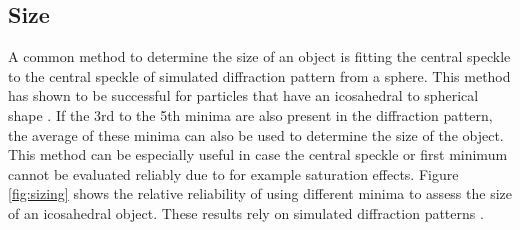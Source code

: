 \subsection{Size}
A common method to determine the size of an object is fitting the central speckle to the central speckle of simulated diffraction pattern from a sphere. This method has shown to be successful for particles that have an icosahedral to spherical shape \cite{Hantke2014,Daurer2017}. If the 3rd to the 5th minima are also present in the diffraction pattern, the average of these minima can also be used to determine the size of the object. This method can be especially useful in case the central speckle or first minimum cannot be evaluated reliably due to for example saturation effects. Figure \ref{fig:sizing} shows the relative reliability of using different minima to assess the size of an icosahedral object. These results rely on simulated diffraction patterns \cite{Hantke2016}.

